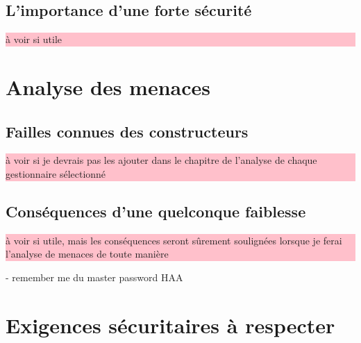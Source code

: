 \subsection{L'importance d'une forte sécurité}
\colorbox{pink}{\parbox{15cm}{à voir si utile}}
\section{Analyse des menaces}
\subsection{Failles connues des constructeurs}
\colorbox{pink}{\parbox{15cm}{à voir si je devrais pas les ajouter dans le chapitre de l'analyse de chaque gestionnaire sélectionné}}
\subsection{Conséquences d'une quelconque faiblesse}
\colorbox{pink}{\parbox{15cm}{à voir si utile, mais les conséquences seront sûrement soulignées lorsque je ferai l'analyse de menaces de toute manière}}
- remember me du master password HAA
\section{Exigences sécuritaires à respecter}